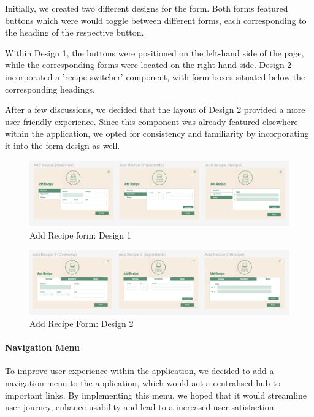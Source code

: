 \documentclass{article}
\begin{document}
Initially, we created two different designs for the form. Both forms featured buttons which were would toggle between different forms, each corresponding to the heading of the respective button.

Within Design 1, the buttons were positioned on the left-hand side of the page, while the corresponding forms were located on the right-hand side. Design 2 incorporated a 'recipe switcher' component, with form boxes situated below the corresponding headings.

After a few discussions, we decided that the layout of Design 2 provided a more user-friendly experience. Since this component was already featured elsewhere within the application, we opted for consistency and familiarity by incorporating it into the form design as well.

\begin{figure}[h]
  \includegraphics[width=1.0\textwidth]{assets/design-images/Design 1 Add Recipe Form.png}
  \centering
  \caption{Add Recipe form: Design 1 }
\end{figure}

\begin{figure}[h]
  \includegraphics[width=1.0\textwidth]{assets/design-images/Design 2 Add Recipe Form.png}
  \centering
  \caption{Add Recipe Form: Design 2}
\end{figure}

\paragraph{Navigation Menu}
To improve user experience within the application, we decided to add a navigation menu to the application, which would act a centralised hub to important links. By implementing this menu, we hoped that it would streamline user journey, enhance usability and lead to a increased user satisfaction.
\end{document}
